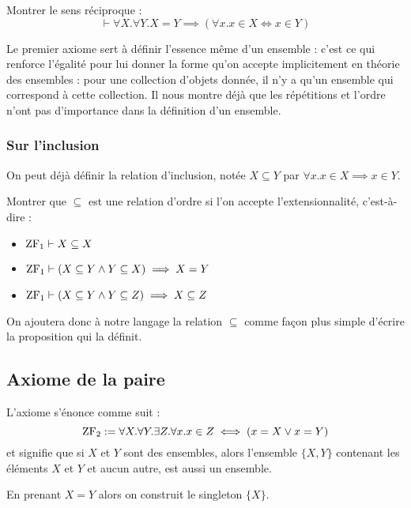 \begin{exo}
    Montrer le sens réciproque : $$\vdash\forall X.\forall Y. X=Y\implies (\forall x. x\in X\iff x\in Y)$$
\end{exo}

Le premier axiome sert à définir l'essence même d'un ensemble : c'est ce qui renforce l'égalité pour lui donner la forme qu'on accepte implicitement en théorie des ensembles : pour une collection d'objets donnée, il n'y a qu'un ensemble qui correspond à cette collection. Il nous montre déjà que les répétitions et l'ordre n'ont pas d'importance dans la définition d'un ensemble.

\subsubsection{Sur l'inclusion}

On peut déjà définir la relation d'inclusion, notée $X\subseteq Y$ par $\forall x. x\in X\implies x \in Y$.

\begin{exo}
    Montrer que $\subseteq$ est une relation d'ordre si l'on accepte l'extensionnalité, c'est-à-dire :
    \begin{itemize}[label=$\bullet$]
        \item $\mathrm{ZF}_1\vdash X\subseteq X$
        \item $\mathrm{ZF}_1\vdash (X\subseteq Y \land Y\subseteq X)\implies X = Y$
        \item $\mathrm{ZF}_1\vdash (X\subseteq Y \land Y\subseteq Z) \implies X\subseteq Z$
    \end{itemize}
\end{exo}

On ajoutera donc à notre langage la relation $\subseteq$ comme façon plus simple d'écrire la proposition qui la définit.

\subsection{Axiome de la paire}

\begin{ax}[Paire]
    L'axiome s'énonce comme suit : $$\mathrm{ZF}_2 := \forall X.\forall Y. \exists Z. \forall x. x\in Z \iff (x=X \lor x=Y)$$ et signifie que si $X$ et $Y$ sont des ensembles, alors l'ensemble $\{X,Y\}$ contenant les éléments $X$ et $Y$ et aucun autre, est aussi un ensemble.
\end{ax}

\begin{rmk}
    En prenant $X=Y$ alors on construit le singleton $\{X\}$.
\end{rmk}

